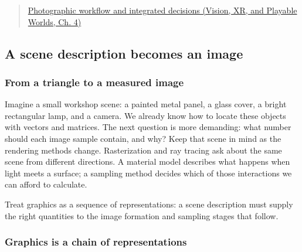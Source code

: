 \begin{quote}
\href{../07-Vision-XR-and-Playable-Worlds/main.pdf\#nameddest=04-visual-computing-ii-ch034-photographic-workflow-and-integrated-decisions}{Photographic workflow and integrated decisions (Vision, XR, and Playable Worlds, Ch. 4)}
\end{quote}

\subsection{A scene description becomes an image}\label{03-visual-computing-i-ch001-a-scene-description-becomes-an-image}

\hypertarget{03-visual-computing-i-ch001-a-scene-description-becomes-an-image}{}

\subsubsection{From a triangle to a measured image}\label{03-visual-computing-i-ch001-from-a-triangle-to-a-measured-image}

\hypertarget{03-visual-computing-i-ch001-from-a-triangle-to-a-measured-image}{}

Imagine a small workshop scene: a painted metal panel, a glass cover, a bright rectangular lamp, and a camera. We already know how to locate these objects with vectors and matrices. The next question is more demanding: what number should each image sample contain, and why? Keep that scene in mind as the rendering methods change. Rasterization and ray tracing ask about the same scene from different directions. A material model describes what happens when light meets a surface; a sampling method decides which of those interactions we can afford to calculate.

Treat graphics as a sequence of representations: a scene description must supply the right quantities to the image formation and sampling stages that follow.

\subsubsection{Graphics is a chain of representations}\label{03-visual-computing-i-ch001-graphics-is-a-chain-of-representations}

\hypertarget{03-visual-computing-i-ch001-graphics-is-a-chain-of-representations}{}

